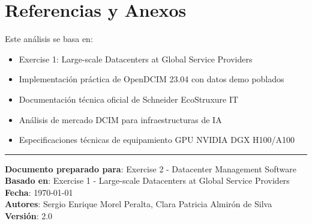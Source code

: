 \documentclass[12pt,a4paper]{article}
\begin{document}
\section{Referencias y Anexos}

Este análisis se basa en:
\begin{itemize}
    \item Exercise 1: Large-scale Datacenters at Global Service Providers
    \item Implementación práctica de OpenDCIM 23.04 con datos demo poblados
    \item Documentación técnica oficial de Schneider EcoStruxure IT
    \item Análisis de mercado DCIM para infraestructuras de IA
    \item Especificaciones técnicas de equipamiento GPU NVIDIA DGX H100/A100
\end{itemize}

\vspace{1cm}
\hrule
\vspace{0.5cm}
\textbf{Documento preparado para}: Exercise 2 - Datacenter Management Software\\
\textbf{Basado en}: Exercise 1 - Large-scale Datacenters at Global Service Providers\\
\textbf{Fecha}: \today\\
\textbf{Autores}: Sergio Enrique Morel Peralta, Clara Patricia Almirón de Silva\\
\textbf{Versión}: 2.0
\end{document}
